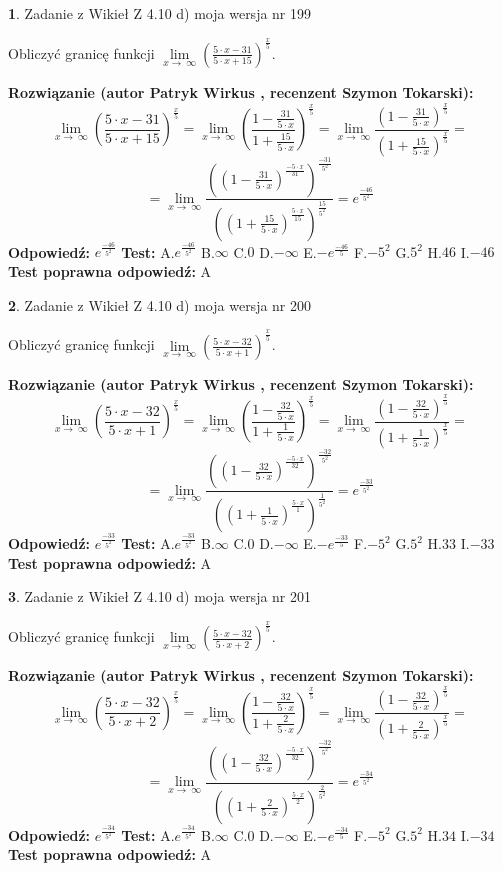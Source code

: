 \documentclass[12pt, a4paper]{article}
\theoremstyle{definition} %
\newtheorem{zad}{}
\newcommand{\zadStart}[1]{\begin{zad}#1\newline}
\newcommand{\zadStop}{\end{zad}}
\newcommand{\rozwStart}[2]{\noindent \textbf{Rozwiązanie (autor #1 , recenzent #2): }\newline}
\newcommand{\rozwStop}{\newline}
\newcommand{\odpStart}{\noindent \textbf{Odpowiedź:}\newline}
\newcommand{\odpStop}{\newline}
\newcommand{\testStart}{\noindent \textbf{Test:}\newline}
\newcommand{\testStop}{\newline}
\newcommand{\kluczStart}{\noindent \textbf{Test poprawna odpowiedź:}\newline}
\newcommand{\kluczStop}{\newline}
\begin{document}
\zadStart{Zadanie z Wikieł Z 4.10 d) moja wersja nr 199}


Obliczyć granicę funkcji  $\lim\limits_{x\to\ \infty}(\frac{5\cdot x-31}{5\cdot x+15})^{\frac{x}{5}}$.
\zadStop
\rozwStart{Patryk Wirkus}{Szymon Tokarski}
$$\lim\limits_{x\to\ \infty}(\frac{5\cdot x-31}{5\cdot x+15})^{\frac{x}{5}} = \lim\limits_{x\to\ \infty}(\frac{1-\frac{31}{5\cdot x}}{1+\frac{15}{5\cdot x}})^{\frac{x}{5}}=\lim\limits_{x\to\ \infty}\frac{(1-\frac{31}{5\cdot x})^{\frac{x}{5}}}{(1+\frac{15}{5\cdot x})^{\frac{x}{5}}}=$$
$$=\lim\limits_{x\to\ \infty}\frac{((1-\frac{31}{5\cdot x})^{\frac{-5\cdot x}{31}})^{\frac{-31}{5^{2}}}}{((1+\frac{15}{5\cdot x})^{\frac{5\cdot x}{15}})^{\frac{15}{5^{2}}}}=e^{\frac{-46}{5^{2}}}$$
\rozwStop
\odpStart
$e^{\frac{-46}{5^{2}}}$
\odpStop
\testStart
A.$e^{\frac{-46}{5^{2}}}$ B.$\infty$ C.$0$ D.$-\infty$ E.$-e^{\frac{-46}{5}}$
F.$-5^{2}$ G.$5^{2}$
H.$46$
I.$-46$
\testStop
\kluczStart
A
\kluczStop



\zadStart{Zadanie z Wikieł Z 4.10 d) moja wersja nr 200}


Obliczyć granicę funkcji  $\lim\limits_{x\to\ \infty}(\frac{5\cdot x-32}{5\cdot x+1})^{\frac{x}{5}}$.
\zadStop
\rozwStart{Patryk Wirkus}{Szymon Tokarski}
$$\lim\limits_{x\to\ \infty}(\frac{5\cdot x-32}{5\cdot x+1})^{\frac{x}{5}} = \lim\limits_{x\to\ \infty}(\frac{1-\frac{32}{5\cdot x}}{1+\frac{1}{5\cdot x}})^{\frac{x}{5}}=\lim\limits_{x\to\ \infty}\frac{(1-\frac{32}{5\cdot x})^{\frac{x}{5}}}{(1+\frac{1}{5\cdot x})^{\frac{x}{5}}}=$$
$$=\lim\limits_{x\to\ \infty}\frac{((1-\frac{32}{5\cdot x})^{\frac{-5\cdot x}{32}})^{\frac{-32}{5^{2}}}}{((1+\frac{1}{5\cdot x})^{\frac{5\cdot x}{1}})^{\frac{1}{5^{2}}}}=e^{\frac{-33}{5^{2}}}$$
\rozwStop
\odpStart
$e^{\frac{-33}{5^{2}}}$
\odpStop
\testStart
A.$e^{\frac{-33}{5^{2}}}$ B.$\infty$ C.$0$ D.$-\infty$ E.$-e^{\frac{-33}{5}}$
F.$-5^{2}$ G.$5^{2}$
H.$33$
I.$-33$
\testStop
\kluczStart
A
\kluczStop



\zadStart{Zadanie z Wikieł Z 4.10 d) moja wersja nr 201}


Obliczyć granicę funkcji  $\lim\limits_{x\to\ \infty}(\frac{5\cdot x-32}{5\cdot x+2})^{\frac{x}{5}}$.
\zadStop
\rozwStart{Patryk Wirkus}{Szymon Tokarski}
$$\lim\limits_{x\to\ \infty}(\frac{5\cdot x-32}{5\cdot x+2})^{\frac{x}{5}} = \lim\limits_{x\to\ \infty}(\frac{1-\frac{32}{5\cdot x}}{1+\frac{2}{5\cdot x}})^{\frac{x}{5}}=\lim\limits_{x\to\ \infty}\frac{(1-\frac{32}{5\cdot x})^{\frac{x}{5}}}{(1+\frac{2}{5\cdot x})^{\frac{x}{5}}}=$$
$$=\lim\limits_{x\to\ \infty}\frac{((1-\frac{32}{5\cdot x})^{\frac{-5\cdot x}{32}})^{\frac{-32}{5^{2}}}}{((1+\frac{2}{5\cdot x})^{\frac{5\cdot x}{2}})^{\frac{2}{5^{2}}}}=e^{\frac{-34}{5^{2}}}$$
\rozwStop
\odpStart
$e^{\frac{-34}{5^{2}}}$
\odpStop
\testStart
A.$e^{\frac{-34}{5^{2}}}$ B.$\infty$ C.$0$ D.$-\infty$ E.$-e^{\frac{-34}{5}}$
F.$-5^{2}$ G.$5^{2}$
H.$34$
I.$-34$
\testStop
\kluczStart
A
\kluczStop
\end{document}
